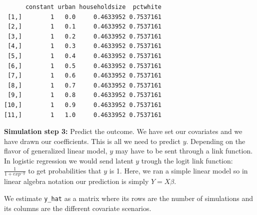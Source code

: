 \documentclass[]{article}
\newenvironment{Shaded}{\begin{snugshade}}{\end{snugshade}}
\newcommand{\CommentTok}[1]{\textcolor[rgb]{0.56,0.35,0.01}{\textit{#1}}}
\newcommand{\DataTypeTok}[1]{\textcolor[rgb]{0.13,0.29,0.53}{#1}}
\newcommand{\DecValTok}[1]{\textcolor[rgb]{0.00,0.00,0.81}{#1}}
\newcommand{\FloatTok}[1]{\textcolor[rgb]{0.00,0.00,0.81}{#1}}
\newcommand{\KeywordTok}[1]{\textcolor[rgb]{0.13,0.29,0.53}{\textbf{#1}}}
\newcommand{\NormalTok}[1]{#1}
\newcommand{\OperatorTok}[1]{\textcolor[rgb]{0.81,0.36,0.00}{\textbf{#1}}}
\newcommand{\StringTok}[1]{\textcolor[rgb]{0.31,0.60,0.02}{#1}}
\begin{document}
\begin{Shaded}
\end{Shaded}

\begin{verbatim}
      constant urban householdsize  pctwhite
 [1,]        1   0.0     0.4633952 0.7537161
 [2,]        1   0.1     0.4633952 0.7537161
 [3,]        1   0.2     0.4633952 0.7537161
 [4,]        1   0.3     0.4633952 0.7537161
 [5,]        1   0.4     0.4633952 0.7537161
 [6,]        1   0.5     0.4633952 0.7537161
 [7,]        1   0.6     0.4633952 0.7537161
 [8,]        1   0.7     0.4633952 0.7537161
 [9,]        1   0.8     0.4633952 0.7537161
[10,]        1   0.9     0.4633952 0.7537161
[11,]        1   1.0     0.4633952 0.7537161
\end{verbatim}

\textbf{Simulation step 3:} Predict the outcome. We have set our covariates and we have drawn our coefficients. This is all we need to predict \(y\). Depending on the flavor of generalized linear model, \(y\) may have to be sent through a link function. In logistic regression we would send latent \(y\) trough the logit link function: \(\frac{1}{1 + exp^{-y}}\) to get probabilities that \(y\) is 1. Here, we ran a simple linear model so in linear algebra notation our prediction is simply \(Y=X\beta\).

We estimate \texttt{y\_hat} as a matrix where its rows are the number of simulations and its columns are the different covariate scenarios.

\begin{Shaded}
\end{Shaded}
\end{document}
